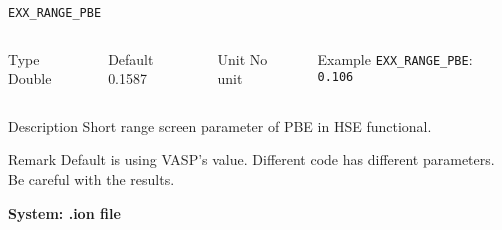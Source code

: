 \documentclass[xcolor=dvipsnames,t]{beamer}
\begin{document}
\begin{frame}[allowframebreaks]{\texttt{EXX\_RANGE\_PBE}} \label{EXX_RANGE_PBE}
\vspace*{-12pt}
\begin{columns}
\begin{block}{Type}
Double
\end{block}

\begin{block}{Default}
0.1587
\end{block}

\begin{block}{Unit}
No unit
\end{block}

\begin{block}{Example}
\texttt{EXX\_RANGE\_PBE}: \texttt{0.106}
\end{block}
\end{columns}

\begin{block}{Description}
Short range screen parameter of PBE in HSE functional. 
\end{block}

\begin{block}{Remark}
Default is using VASP's value. Different code has different parameters. Be careful with the results. 
\end{block}

\end{frame}

\begin{frame}[allowframebreaks,c]{} \label{System:ion}

\begin{center}
\Huge \textbf{System: .ion file}
\end{center}

\end{frame}
\end{document}
